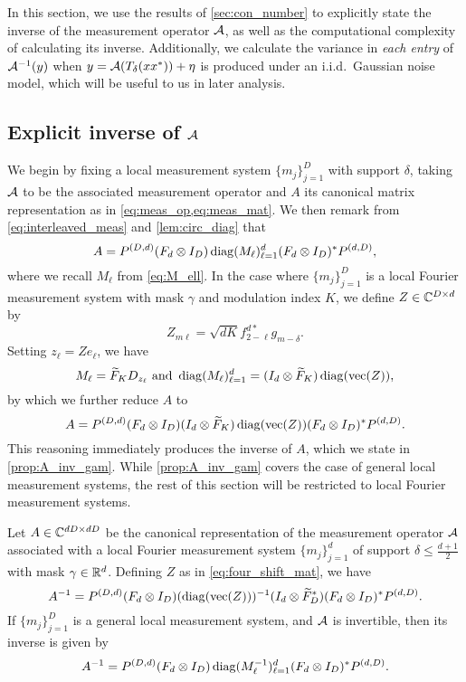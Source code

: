 In this section, we use the results of \cref{sec:con_number} to explicitly state the inverse of the measurement operator $\mathcal{A}$, as well as the computational complexity of calculating its inverse.  Additionally, we calculate the variance in \emph{each entry} of $\mathcal{A}^{-1}(y)$ when $y = \mathcal{A}(T_\delta(x x^*)) + \eta$ is produced under an i.i.d.~Gaussian noise model, which will be useful to us in later analysis.

\subsection{Explicit inverse of $\mathcal{A}$}
\label{sec:inv_runtime}

We begin by fixing a local measurement system $\{m_j\}_{j = 1}^D$ with support $\delta$, taking $\mathcal{A}$ to be the associated measurement operator and $A$ its canonical matrix representation as in \cref{eq:meas_op,eq:meas_mat}.  We then remark from \eqref{eq:interleaved_meas} and \cref{lem:circ_diag} that \[A = P^{(D, d)} (F_d \otimes I_D) \operatorname{diag}(M_\ell)_{\ell = 1}^d (F_d \otimes I_D)^* P^{(d, D)},\]  where we recall $M_\ell$ from \eqref{eq:M_ell}.  In the case where $\{m_j\}_{j = 1}^D$ is a local Fourier measurement system with mask $\gamma$ and modulation index $K$, we define $Z \in \mathbb{C}^{D \times d}$ by \begin{equation} Z_{m \ell} = \sqrt{d K} f_{2 - \ell}^{d*} g_{m - \delta}. \label{eq:four_shift_mat}\end{equation}  Setting $z_\ell = Z e_\ell$, we have \begin{equation} M_\ell = \tF_K D_{z_\ell} \ \text{and} \ \diag(M_\ell)_{\ell = 1}^d = (I_d \otimes \tF_K) \diag(\vec(Z)), \label{eq:M_rearr} \end{equation} by which we further reduce $A$ to \[A = P^{(D, d)} (F_d \otimes I_D) (I_d \otimes \widetilde{F}_K) \operatorname{diag}(\operatorname{vec}(Z)) (F_d \otimes I_D)^* P^{(d, D)}.\]  This reasoning immediately produces the inverse of $A$, which we state in \cref{prop:A_inv_gam}.  While \cref{prop:A_inv_gam} covers the case of general local measurement systems, the rest of this section will be restricted to local Fourier measurement systems.

\begin{proposition} \label{prop:A_inv_gam}
  Let $A \in \mathbb{C}^{d D \times d D}$ be the canonical representation of the measurement operator $\mathcal{A}$ associated with a local Fourier measurement system $\{m_j\}_{j = 1}^d$ of support $\delta \le \frac{d + 1}{2}$ with mask $\gamma \in \mathbb{R}^d$.  Defining $Z$ as in \eqref{eq:four_shift_mat}, we have
  \begin{equation} A^{-1} = P^{(D, d)} (F_d \otimes I_D) (\operatorname{diag}(\operatorname{vec}(Z)))^{-1} (I_d \otimes \widetilde{F}_D^*) (F_d \otimes I_D)^* P^{(d, D)}. \label{eq:A_inv_gam} \end{equation} If $\{m_j\}_{j = 1}^D$ is a general local measurement system, and $\mathcal{A}$ is invertible, then its inverse is given by \[A^{-1} = P^{(D, d)} (F_d \otimes I_D) \operatorname{diag}(M_\ell^{-1})_{\ell = 1}^d (F_d \otimes I_D)^* P^{(d, D)}.\]
\end{proposition}

